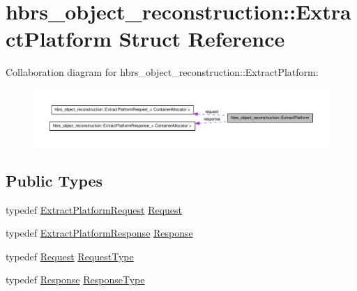 \hypertarget{structhbrs__object__reconstruction_1_1_extract_platform}{\section{hbrs\-\_\-object\-\_\-reconstruction\-:\-:\-Extract\-Platform \-Struct \-Reference}
\label{structhbrs__object__reconstruction_1_1_extract_platform}
}


\-Collaboration diagram for hbrs\-\_\-object\-\_\-reconstruction\-:\-:\-Extract\-Platform\-:\nopagebreak
\begin{figure}[H]
\begin{center}
\leavevmode
\includegraphics[width=350pt]{structhbrs__object__reconstruction_1_1_extract_platform__coll__graph}
\end{center}
\end{figure}
\subsection*{\-Public \-Types}
\begin{DoxyCompactItemize}
\item 
typedef \hyperlink{namespacehbrs__object__reconstruction_a41ceceb45876d46f34df4d565d3b4e66}{\-Extract\-Platform\-Request} \hyperlink{structhbrs__object__reconstruction_1_1_extract_platform_a20caf0ee2df329f57f79fb57560020d7}{\-Request}
\item 
typedef \hyperlink{namespacehbrs__object__reconstruction_ac3d2f621d6e4ff937ecd7c90e7e69104}{\-Extract\-Platform\-Response} \hyperlink{structhbrs__object__reconstruction_1_1_extract_platform_ad428e95b416f00284f5445b5771d2046}{\-Response}
\item 
typedef \hyperlink{structhbrs__object__reconstruction_1_1_extract_platform_a20caf0ee2df329f57f79fb57560020d7}{\-Request} \hyperlink{structhbrs__object__reconstruction_1_1_extract_platform_a2532e833420e31a667c0f947c0903957}{\-Request\-Type}
\item 
typedef \hyperlink{structhbrs__object__reconstruction_1_1_extract_platform_ad428e95b416f00284f5445b5771d2046}{\-Response} \hyperlink{structhbrs__object__reconstruction_1_1_extract_platform_ab723bf3001138486f42d752c8fa7b63e}{\-Response\-Type}
\end{DoxyCompactItemize}
